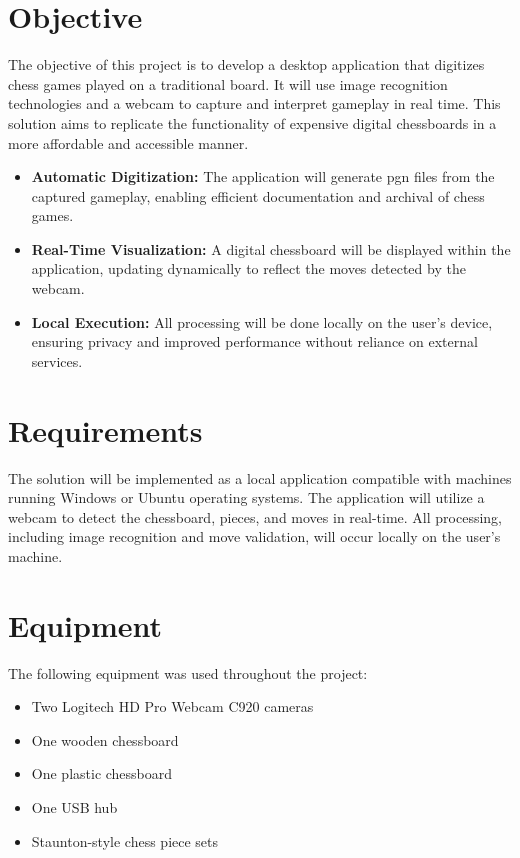 \section{Objective}

The objective of this project is to develop a desktop application that digitizes chess games played on a traditional board. It will use image recognition technologies and a webcam to capture and interpret gameplay in real time. This solution aims to replicate the functionality of expensive digital chessboards in a more affordable and accessible manner.

\begin{itemize}
    \item \textbf{Automatic Digitization:} The application will generate \gls{pgn} files from the captured gameplay, enabling efficient documentation and archival of chess games.

    \item \textbf{Real-Time Visualization:} A digital chessboard will be displayed within the application, updating dynamically to reflect the moves detected by the webcam.

    \item \textbf{Local Execution:} All processing will be done locally on the user’s device, ensuring privacy and improved performance without reliance on external
    services.
\end{itemize}

\section{Requirements}

The solution will be implemented as a local application compatible with machines running Windows or Ubuntu operating systems. The application will utilize a webcam to detect the chessboard, pieces, and moves in real-time. All processing, including image recognition and move validation, will occur locally on the user's machine.

\section{Equipment}
The following equipment was used throughout the project:

\begin{itemize}
    \item Two Logitech HD Pro Webcam C920 cameras
    \item One wooden chessboard
    \item One plastic chessboard
    \item One USB hub
    \item Staunton-style chess piece sets
\end{itemize}


